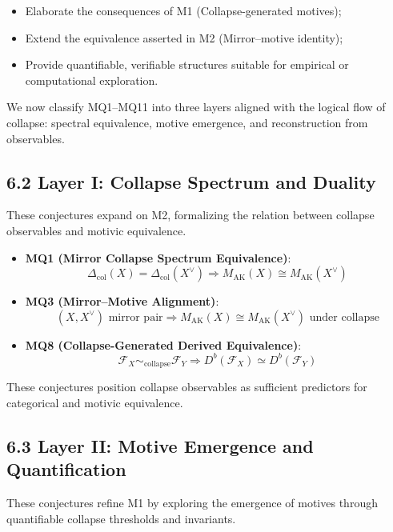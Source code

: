 \documentclass[11pt]{article}
\begin{document}
\begin{itemize}
    \item Elaborate the consequences of M1 (Collapse-generated motives);
    \item Extend the equivalence asserted in M2 (Mirror–motive identity);
    \item Provide quantifiable, verifiable structures suitable for empirical or computational exploration.
\end{itemize}

We now classify MQ1–MQ11 into three layers aligned with the logical flow of collapse: spectral equivalence, motive emergence, and reconstruction from observables.

\subsection{6.2 Layer I: Collapse Spectrum and Duality}

These conjectures expand on M2, formalizing the relation between collapse observables and motivic equivalence.

\begin{itemize}
    \item \textbf{MQ1 (Mirror Collapse Spectrum Equivalence)}:
    \[
    \Delta_{\mathrm{col}}(X) = \Delta_{\mathrm{col}}(X^{\vee}) \Rightarrow M_{\mathrm{AK}}(X) \cong M_{\mathrm{AK}}(X^{\vee})
    \]
    \item \textbf{MQ3 (Mirror–Motive Alignment)}:
    \[
    (X, X^{\vee}) \text{ mirror pair} \Rightarrow M_{\mathrm{AK}}(X) \cong M_{\mathrm{AK}}(X^{\vee}) \text{ under collapse}
    \]
    \item \textbf{MQ8 (Collapse-Generated Derived Equivalence)}:
    \[
    \mathcal{F}_X \sim_{\text{collapse}} \mathcal{F}_Y \Rightarrow D^b(\mathcal{F}_X) \simeq D^b(\mathcal{F}_Y)
    \]
\end{itemize}

These conjectures position collapse observables as sufficient predictors for categorical and motivic equivalence.

\subsection{6.3 Layer II: Motive Emergence and Quantification}

These conjectures refine M1 by exploring the emergence of motives through quantifiable collapse thresholds and invariants.
\end{document}
